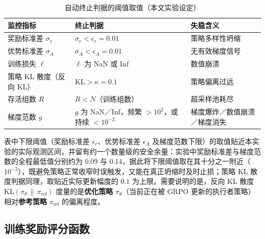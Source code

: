 \begin{table}[htbp]
    \centering
    \caption{自动终止判据的阈值取值（本文实验设定）}
    \label{tab:stop_thresholds}
    \begin{tabularx}{\textwidth}{l >{\raggedright\arraybackslash\hsize=0.85\hsize}X >{\raggedright\arraybackslash\hsize=1.15\hsize}X}
        \hline
        监控指标 & 终止判据 & 失稳含义 \\
        \hline
        奖励标准差 $\sigma_r$ & $\sigma_r < \epsilon_r = 0.01$ & 策略多样性坍缩 \\
        优势标准差 $\sigma_A$ & $\sigma_A < \epsilon_A = 0.01$ & 无有效梯度信号 \\
        训练损失 $\ell$ & $\ell$ 为 NaN 或 Inf & 数值崩溃 \\
        策略 KL 散度（反向 KL） & $\text{KL} > \kappa = 0.1$ & 策略偏离过远 \\
        存活组数 $R$ & $R < N$（训练组数） & 超采样池耗尽 \\
        梯度范数 $g$ & $g$ 为 NaN／Inf，频繁 $> 10^{2}$，或持续 $< 10^{-2}$ & 梯度爆炸／数值崩溃／梯度消失 \\
        \hline
    \end{tabularx}
\end{table}

表中下限阈值（奖励标准差 $\epsilon_r$、优势标准差 $\epsilon_A$ 及梯度范数下限）的取值贴近本实验的实际观测区间，并留有约一个数量级的安全余量：实验中奖励标准差与梯度范数的全程最低值分别约为 0.09 与 0.14，据此将下限阈值取在其十分之一附近（$10^{-2}$），既避免策略正常收窄时误触发，又能在真正坍缩时及时止损；策略 KL 散度判据同理，取贴近实际更新幅度的 $0.1$ 为上限。需要说明的是，反向 KL 散度 $\text{KL}(\pi_\theta \,\|\, \pi_{\text{ref}})$ 度量的是\textbf{优化策略} $\pi_\theta$（当前正在被 GRPO 更新的执行者策略）相对\textbf{参考策略} $\pi_{\text{ref}}$ 的偏离程度。

\subsection{训练奖励评分函数}

